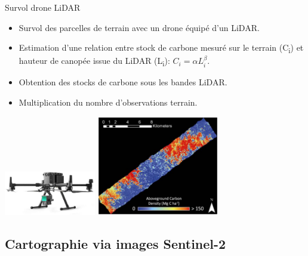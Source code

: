 \documentclass[10pt,table,dvipsnames,compress]{beamer}
\begin{document}
\begin{frame}[label={sec:orgc6ff37a}]{Survol drone LiDAR}
\begin{itemize}
\item Survol des parcelles de terrain avec un drone équipé d'un LiDAR.
\item Estimation d'une relation entre stock de carbone mesuré sur le terrain (C\textsubscript{i}) et hauteur de canopée issue du LiDAR (L\textsubscript{i}): \(C_i = \alpha L_i^{\beta}\).
\item Obtention des stocks de carbone sous les bandes LiDAR.
\item Multiplication du nombre d'observations terrain.
\end{itemize}

\begin{center}
\includegraphics[width=0.3\textwidth]{figs/lidar-drone.jpg}
\includegraphics[width=0.4\textwidth]{figs/map-lidar.png}
\end{center}
\end{frame}

\subsection{Cartographie via images Sentinel-2}
\label{sec:orge5bae9a}
\end{document}
